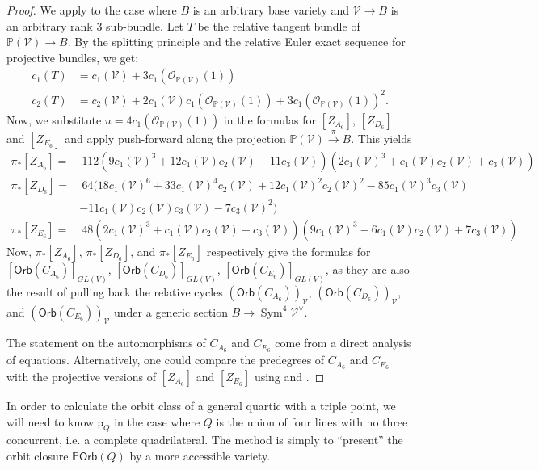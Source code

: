 \documentclass[12 pt, reqno]{amsart}
\theoremstyle{definition}
\newcommand{\on}{\operatorname}
\newcommand{\mb}{\mathbb}
\newcommand{\mc}{\mathcal}
\newcommand{\ms}{\mathscr}
\renewcommand{\P}{\mb{P}}
\newcommand{\Orb}{\mathsf{Orb}}
\newcommand{\p}{\mathsf{p}}
\begin{document}
\begin{proof}
  We apply  to the case where $B$ is an arbitrary base
  variety and $\mc{V} \to B$ is an arbitrary rank $3$ sub-bundle. Let
  $T$ be the relative tangent bundle of $\mb{P}(\mc{V})\to B$. By the
  splitting principle and the relative Euler exact sequence for
  projective bundles, we get:
\begin{align*}
  c_1(T)&= c_1(\mc{V}) + 3c_1(\ms{O}_{\mb{P}(\mc{V})}(1)) \\
  c_2(T) &= c_2(\mc{V}) + 2 c_1(\mc{V}) c_1(\ms{O}_{\mb{P}(\mc{V})}(1)) + 3 c_1(\ms{O}_{\mb{P}(\mc{V})}(1))^2.
\end{align*}
Now, we substitute $u=4c_1(\ms{O}_{\mb{P}(\mc{V})}(1))$ in the
formulas for $[Z_{A_6}]$, $[Z_{D_6}]$ and $[Z_{E_6}]$ 
and apply push-forward along the projection
$\mb{P}(\mc{V})\xrightarrow{\pi} B$. This yields
\begin{align*}
  \pi_{*}[Z_{A_6}]=&\ 112 (9 c_1(\mc{V})^3 + 12 c_1(\mc{V}) c_2(\mc{V}) - 11 c_3(\mc{V})) (2 c_1(\mc{V})^3 + c_1(\mc{V}) c_2(\mc{V}) + c_3(\mc{V}))\\
  \pi_{*}[Z_{D_6}]=&\ 64 (18 c_1(\mc{V})^6 + 33 c_1(\mc{V})^4 c_2(\mc{V}) + 12 c_1(\mc{V})^2 c_2(\mc{V})^2 - 85 c_1(\mc{V})^3 c_3(\mc{V}) \\
  & - 11 c_1(\mc{V}) c_2(\mc{V}) c_3(\mc{V}) - 7 c_3(\mc{V})^2)\\
  \pi_{*}[Z_{E_6}]=&\ 48 (2 c_1(\mc{V})^3 + c_1(\mc{V}) c_2(\mc{V}) + c_3(\mc{V})) (9 c_1(\mc{V})^3 - 6 c_1(\mc{V}) c_2(\mc{V}) + 7 c_3(\mc{V})).
\end{align*}
Now, $\pi_{*}[Z_{A_6}]$, $\pi_{*}[Z_{D_6}]$, and $\pi_{*}[Z_{E_6}]$
respectively give the formulas for $[\Orb({C_{A_6}})]_{GL(V)}$,
$[\Orb({C_{D_6}})]_{GL(V)}$, $[\Orb({C_{E_6}})]_{GL(V)}$, as they are
also the result of pulling back the relative cycles
$(\Orb({C_{A_6}}))_{\mc{V}}$, $(\Orb({C_{D_6}}))_{\mc{V}}$, and
$(\Orb({C_{E_6}}))_{\mc{V}}$ under a generic section
$B\to \on{Sym}^4\mc{V}^{\vee}$.

The statement on the automorphisms of $C_{A_6}$ and $C_{E_6}$ come
from a direct analysis of equations. Alternatively, one could compare
the predegrees of $C_{A_6}$ and $C_{E_6}$ with the projective versions
of $[Z_{A_6}]$ and $[Z_{E_6}]$ using \cite[Examples 5.2 and 5.4]{AF00}
and .
\end{proof}


In order to calculate the orbit class of a general quartic with a
triple point, we will need to know $\p_Q$ in the case where $Q$ is the
union of four lines with no three concurrent, i.e. a complete
quadrilateral.  The method is simply to ``present'' the orbit closure
$\P \Orb(Q)$ by a more accessible variety.
\end{document}
